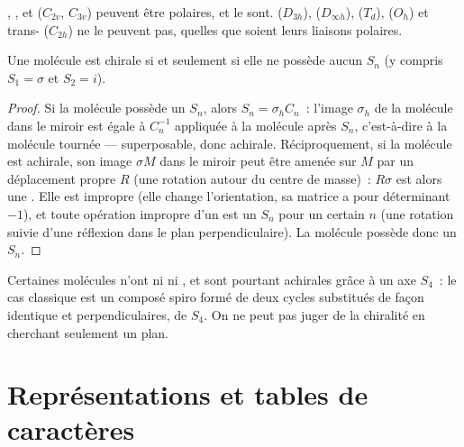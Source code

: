 \begin{example}\label{ex:b3:point-groups:polar}
, ,  et  ($C_{2v}$, $C_{3v}$) peuvent
être polaires, et le sont.  ($D_{3h}$),  ($D_{\infty h}$),  ($T_d$),  ($O_h$)
et trans- ($C_{2h}$) ne le peuvent pas, quelles que soient leurs
liaisons polaires.
\end{example}

\begin{theorem}\label{thm:b3:point-groups:chiral}
Une molécule est chirale si et seulement si elle ne possède aucun  $S_n$
(y compris $S_1 = \sigma$ et $S_2 = i$).
\end{theorem}

\begin{proof}
Si la molécule possède un $S_n$, alors $S_n = \sigma_hC_n$~: l'image
$\sigma_h$ de la molécule dans le miroir est égale à $C_n^{-1}$
appliquée à la molécule après $S_n$, c'est-à-dire à la molécule tournée
--- superposable, donc achirale. Réciproquement, si la molécule est
achirale, son image $\sigma M$ dans le miroir peut être amenée sur $M$
par un déplacement propre $R$ (une rotation autour du centre de masse)~:
$R\sigma$ est alors une . Elle est impropre (elle
change l'orientation, sa matrice a pour déterminant $-1$), et toute
opération impropre d'un  est un
$S_n$ pour un certain $n$ (une rotation suivie d'une réflexion dans le
plan perpendiculaire). La molécule possède donc un $S_n$.
\end{proof}

\begin{example}\label{ex:b3:point-groups:s4}
Certaines molécules n'ont ni  ni , et
sont pourtant achirales grâce à un axe $S_4$~: le cas classique est un
composé spiro formé de deux cycles substitués de façon identique et
perpendiculaires, de  $S_4$. On ne peut pas juger de la
chiralité en cherchant seulement un plan.
\end{example}

\section{Représentations et tables de caractères}

